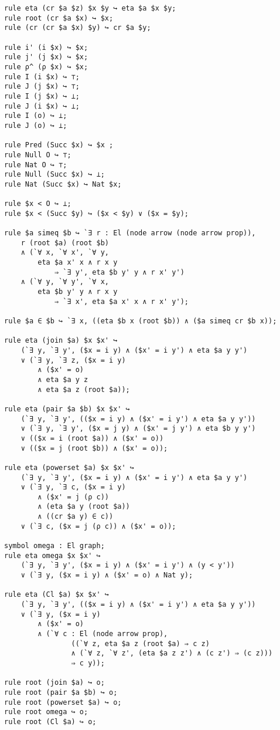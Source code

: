 \documentclass[a4paper]{article}
\begin{document}
\begin{lstlisting}
rule eta (cr $a $z) $x $y ↪ eta $a $x $y;
rule root (cr $a $x) ↪ $x;
rule (cr (cr $a $x) $y) ↪ cr $a $y;

rule i' (i $x) ↪ $x;
rule j' (j $x) ↪ $x;
rule ρ^ (ρ $x) ↪ $x;
rule I (i $x) ↪ ⊤;
rule J (j $x) ↪ ⊤;
rule I (j $x) ↪ ⊥;
rule J (i $x) ↪ ⊥;
rule I (o) ↪ ⊥;
rule J (o) ↪ ⊥;

rule Pred (Succ $x) ↪ $x ;
rule Null O ↪ ⊤;
rule Nat O ↪ ⊤;
rule Null (Succ $x) ↪ ⊥;
rule Nat (Succ $x) ↪ Nat $x;

rule $x < O ↪ ⊥;
rule $x < (Succ $y) ↪ ($x < $y) ∨ ($x = $y);

rule $a simeq $b ↪ `∃ r : El (node arrow (node arrow prop)), 
    r (root $a) (root $b)
    ∧ (`∀ x, `∀ x', `∀ y, 
        eta $a x' x ∧ r x y
            ⇒ `∃ y', eta $b y' y ∧ r x' y')
    ∧ (`∀ y, `∀ y', `∀ x, 
        eta $b y' y ∧ r x y
            ⇒ `∃ x', eta $a x' x ∧ r x' y');

rule $a ∈ $b ↪ `∃ x, ((eta $b x (root $b)) ∧ ($a simeq cr $b x));

rule eta (join $a) $x $x' ↪ 
	(`∃ y, `∃ y', ($x = i y) ∧ ($x' = i y') ∧ eta $a y y')
    ∨ (`∃ y, `∃ z, ($x = i y) 
    	∧ ($x' = o) 
    	∧ eta $a y z 
    	∧ eta $a z (root $a));

rule eta (pair $a $b) $x $x' ↪ 
	(`∃ y, `∃ y', (($x = i y) ∧ ($x' = i y') ∧ eta $a y y'))
    ∨ (`∃ y, `∃ y', ($x = j y) ∧ ($x' = j y') ∧ eta $b y y')
    ∨ (($x = i (root $a)) ∧ ($x' = o))
    ∨ (($x = j (root $b)) ∧ ($x' = o));

rule eta (powerset $a) $x $x' ↪ 
	(`∃ y, `∃ y', ($x = i y) ∧ ($x' = i y') ∧ eta $a y y')
    ∨ (`∃ y, `∃ c, ($x = i y) 
    	∧ ($x' = j (ρ c)) 
    	∧ (eta $a y (root $a)) 
    	∧ ((cr $a y) ∈ c))
    ∨ (`∃ c, ($x = j (ρ c)) ∧ ($x' = o));

symbol omega : El graph;
rule eta omega $x $x' ↪ 
	(`∃ y, `∃ y', ($x = i y) ∧ ($x' = i y') ∧ (y < y'))
    ∨ (`∃ y, ($x = i y) ∧ ($x' = o) ∧ Nat y);

rule eta (Cl $a) $x $x' ↪ 
	(`∃ y, `∃ y', (($x = i y) ∧ ($x' = i y') ∧ eta $a y y'))
    ∨ (`∃ y, ($x = i y) 
        ∧ ($x' = o)
        ∧ (`∀ c : El (node arrow prop), 
                ((`∀ z, eta $a z (root $a) ⇒ c z)
                ∧ (`∀ z, `∀ z', (eta $a z z') ∧ (c z') ⇒ (c z)))
            	⇒ c y));
            
rule root (join $a) ↪ o;
rule root (pair $a $b) ↪ o;
rule root (powerset $a) ↪ o;
rule root omega ↪ o;
rule root (Cl $a) ↪ o;

\end{lstlisting}
\end{document}

